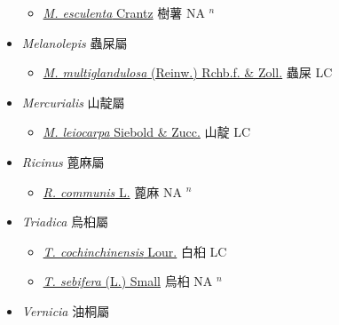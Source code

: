\begin{itemize}
  \begin{itemize}
        \item[] \href{http://www.theplantlist.org/tpl1.1/search?q=Manihot+esculenta}{\textit{M. esculenta} Crantz}   樹薯 NA $^n$
  \end{itemize}
 \item[] \textit{Melanolepis} 蟲屎屬
                    
  \begin{itemize}
        \item[] \href{http://www.theplantlist.org/tpl1.1/search?q=Melanolepis+multiglandulosa}{\textit{M. multiglandulosa} (Reinw.) Rchb.f. \& Zoll.}   蟲屎 LC
  \end{itemize}
 \item[] \textit{Mercurialis} 山靛屬
                    
  \begin{itemize}
        \item[] \href{http://www.theplantlist.org/tpl1.1/search?q=Mercurialis+leiocarpa}{\textit{M. leiocarpa} Siebold \& Zucc.}   山靛 LC
  \end{itemize}
 \item[] \textit{Ricinus} 蓖麻屬
                    
  \begin{itemize}
        \item[] \href{http://www.theplantlist.org/tpl1.1/search?q=Ricinus+communis}{\textit{R. communis} L.}   蓖麻 NA $^n$
  \end{itemize}
 \item[] \textit{Triadica} 烏桕屬
                    
  \begin{itemize}
        \item[] \href{http://www.theplantlist.org/tpl1.1/search?q=Triadica+cochinchinensis}{\textit{T. cochinchinensis} Lour.}     白桕 LC
        \item[] \href{http://www.theplantlist.org/tpl1.1/search?q=Triadica+sebifera}{\textit{T. sebifera} (L.) Small}     烏桕 NA $^n$
  \end{itemize}
 \item[] \textit{Vernicia} 油桐屬
                    

\end{itemize}

